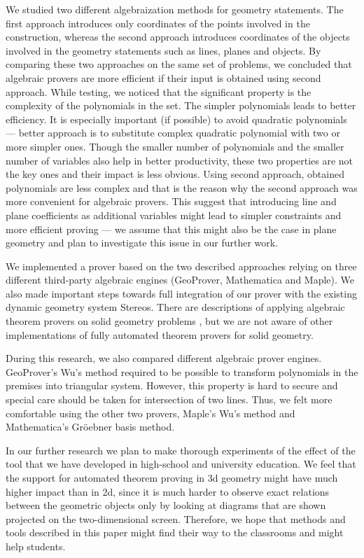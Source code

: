 \documentclass[final,1p,times,authoryear]{elsarticle}
\begin{document}
We studied two different algebraization methods for geometry
statements. The first approach introduces only coordinates of the
points involved in the construction, whereas the second approach
introduces coordinates of the objects involved in the geometry
statements such as lines, planes and objects. By comparing these two
approaches on the same set of problems, we concluded that algebraic
provers are more efficient if their input is obtained using second
approach. While testing, we noticed that the significant property is
the complexity of the polynomials in the set. The simpler polynomials
leads to better efficiency. It is especially important (if possible)
to avoid quadratic polynomials --- better approach is to substitute
complex quadratic polynomial with two or more simpler ones. Though the
smaller number of polynomials and the smaller number of variables also
help in better productivity, these two properties are not the key ones
and their impact is less obvious. Using second approach, obtained
polynomials are less complex and that is the reason why the second
approach was more convenient for algebraic provers. This suggest that
introducing line and plane coefficients as additional variables might
lead to simpler constraints and more efficient proving --- we assume
that this might also be the case in plane geometry and plan to
investigate this issue in our further work.

We implemented a prover based on the two described approaches relying
on three different third-party algebraic engines (GeoProver,
Mathematica and Maple). We also made important steps towards full
integration of our prover with the existing dynamic geometry system
Stereos. There are descriptions of applying algebraic theorem provers
on solid geometry problems \cite{shao2016challenging}, but we are not
aware of other implementations of fully automated theorem provers for
solid geometry.

During this research, we also compared different algebraic prover
engines. GeoProver's Wu's method required to be possible to transform
polynomials in the premises into triangular system. However, this
property is hard to secure and special care should be taken for
intersection of two lines. Thus, we felt more comfortable using the
other two provers, Maple's Wu's method and Mathematica's Gr\"oebner
basis method.

In our further research we plan to make thorough experiments of the
effect of the tool that we have developed in high-school and
university education. We feel that the support for automated theorem
proving in 3d geometry might have much higher impact than in 2d, since
it is much harder to observe exact relations between the geometric
objects only by looking at diagrams that are shown projected on the
two-dimensional screen. Therefore, we hope that methods and tools
described in this paper might find their way to the classrooms and
might help students.





\end{document}
